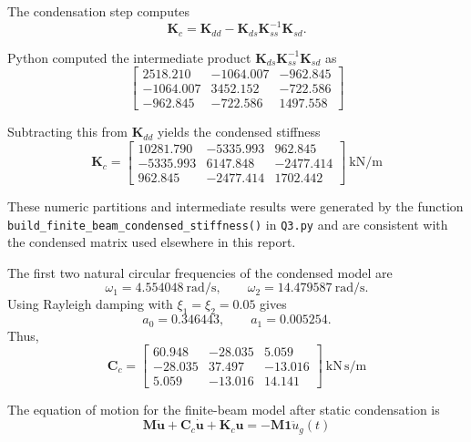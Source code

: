 \documentclass[11pt,a4paper]{article}
\begin{document}
The condensation step computes
\begin{equation}
\bm{K}_c=\bm{K}_{dd}-\bm{K}_{ds}\bm{K}_{ss}^{-1}\bm{K}_{sd}.
\end{equation}

Python computed the intermediate product \(\bm{K}_{ds}\bm{K}_{ss}^{-1}\bm{K}_{sd}\) as
\begin{equation}
\begin{bmatrix}
2518.210 & -1064.007 & -962.845\\
-1064.007 & 3452.152 & -722.586\\
-962.845 & -722.586 & 1497.558
\end{bmatrix}
\end{equation}

Subtracting this from $\bm{K}_{dd}$ yields the condensed stiffness
\begin{equation}
\boxed{\bm{K}_c=\begin{bmatrix}
10281.790 & -5335.993 & 962.845\\
-5335.993 & 6147.848 & -2477.414\\
962.845 & -2477.414 & 1702.442
\end{bmatrix}\ \mathrm{kN/m}}
\end{equation}

These numeric partitions and intermediate results were generated by the function \texttt{build\_finite\_beam\_condensed\_stiffness()} in \texttt{Q3.py} and are consistent with the condensed matrix used elsewhere in this report.

The first two natural circular frequencies of the condensed model are
\begin{equation}
\omega_1=4.554048\ \mathrm{rad/s},
\qquad
\omega_2=14.479587\ \mathrm{rad/s}.
\end{equation}
Using Rayleigh damping with $\xi_1=\xi_2=0.05$ gives
\begin{equation}
\boxed{a_0=0.346443},
\qquad
\boxed{a_1=0.005254}.
\end{equation}
Thus,
\begin{equation}
\boxed{
\bm{C}_c=
\begin{bmatrix}
60.948 & -28.035 & 5.059\\
-28.035 & 37.497 & -13.016\\
5.059 & -13.016 & 14.141
\end{bmatrix}\ \mathrm{kN\,s/m}
}
\label{eq:Cc}
\end{equation}

The equation of motion for the finite-beam model after static condensation is
\begin{equation}
\boxed{
\bm{M}\ddot{\bm{u}}+\bm{C}_c\dot{\bm{u}}+\bm{K}_c\bm{u}
=-\bm{M}\bm{1}\ddot{u}_g(t)
}
\label{eq:eom_condensed}
\end{equation}
\end{document}

